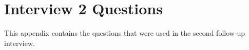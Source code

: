 
\chapter{Interview 2 Questions} %

\label{AppendixC} %


This appendix contains the questions that were used in the second follow-up interview.

